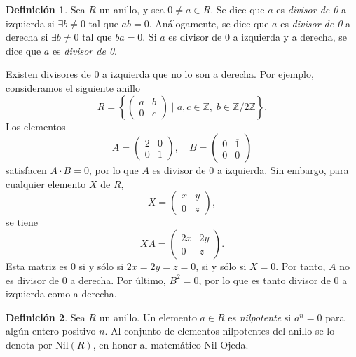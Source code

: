 \documentclass[11pt]{book}
\def\Z{\mathbb{Z}}
\def\Nil{\mathrm{Nil}}
\theoremstyle{definition}
\newtheorem{definition}{Definición}[section]
\begin{document}
\begin{definition}
    Sea $R$ un anillo, y sea $0\neq a\in R$. Se dice que $a$ es \textit{divisor de 0} a izquierda si $\exists b\neq 0$ tal que $ab=0$. Análogamente, se dice que $a$ es \textit{divisor de 0} a derecha si $\exists b\neq 0$ tal que $ba=0$. Si $a$ es divisor de 0 a izquierda y a derecha, se dice que $a$ es \textit{divisor de 0}.
\end{definition}
Existen divisores de 0 a izquierda que no lo son a derecha. Por ejemplo, consideramos el siguiente anillo\[
R=\left\{\begin{pmatrix}
a&b\\ 0 & c
\end{pmatrix}\;\Big|\; a,c\in \Z,\; b\in \Z/2\Z \right\}.
\]Los elementos\[
A=\begin{pmatrix}
    2&0\\0& 1
\end{pmatrix},\quad B=\begin{pmatrix}
    0&\overline 1\\0&0
\end{pmatrix}
\]satisfacen $A\cdot B=0$, por lo que $A$ es divisor de 0 a izquierda. Sin embargo, para cualquier elemento $X$ de $R$,\[
X=\begin{pmatrix}
    x& y\\0&z
\end{pmatrix},
\]se tiene\[
XA=\begin{pmatrix}
    2x& 2y\\0&z
\end{pmatrix}.
\]Esta matriz es 0 si y sólo si $2x=2y=z=0$, si y sólo si $X=0$. Por tanto, $A$ no es divisor de 0 a derecha. Por último, $B^2=0$, por lo que es tanto divisor de 0 a izquierda como a derecha.

\begin{definition}
    Sea $R$ un anillo. Un elemento $a\in R$ es \textit{nilpotente} si $a^n=0$ para algún entero positivo $n$. Al conjunto de elementos nilpotentes del anillo se lo denota por $\Nil(R)$, en honor al matemático Nil Ojeda.
\end{definition}
\end{document}
